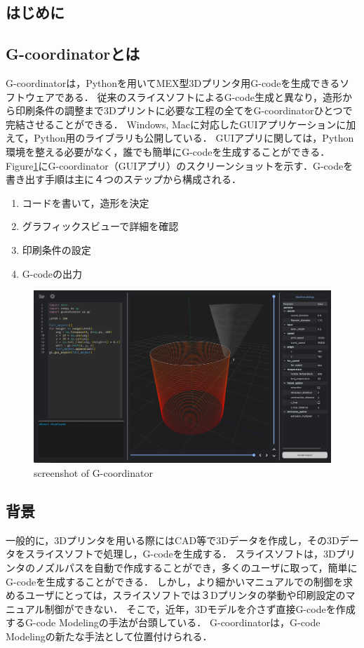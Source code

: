 \documentclass{article}
\begin{document}
\begin{twocolumn}

\section{はじめに}
\subsection{G-coordinatorとは}
G-coordinatorは，Pythonを用いてMEX型3Dプリンタ用G-codeを生成できるソフトウェアである．
従来のスライスソフトによるG-code生成と異なり，造形から印刷条件の調整まで3Dプリントに必要な工程の全てをG-coordinatorひとつで完結させることができる．
Windows, Macに対応したGUIアプリケーションに加えて，Python用のライブラリも公開している．
GUIアプリに関しては，Python環境を整える必要がなく，誰でも簡単にG-codeを生成することができる．
Figure\ref{fig:1}にG-coordinator（GUIアプリ）のスクリーンショットを示す．G-codeを書き出す手順は主に４つのステップから構成される．
\begin{enumerate}
  \item コードを書いて，造形を決定
  \item グラフィックスビューで詳細を確認
  \item 印刷条件の設定
  \item G-codeの出力
\end{enumerate}

\begin{figure}[h]
  \includegraphics[width=\linewidth]{img/screenshot.png}
  \caption{screenshot of G-coordinator}
  \label{fig:1}
\end{figure}
  
\subsection{背景}
一般的に，3Dプリンタを用いる際にはCAD等で3Dデータを作成し，その3Dデータをスライスソフトで処理し，G-codeを生成する．
スライスソフトは，3Dプリンタのノズルパスを自動で作成することができ，多くのユーザに取って，簡単にG-codeを生成することができる．
しかし，より細かいマニュアルでの制御を求めるユーザにとっては，スライスソフトでは３Dプリンタの挙動や印刷設定のマニュアル制御ができない．
そこで，近年，3Dモデルを介さず直接G-codeを作成するG-code Modeling\cite{chinen_thesis}の手法が台頭している．
G-coordinatorは，G-code Modelingの新たな手法として位置付けられる．


\end{twocolumn}
\end{document}
